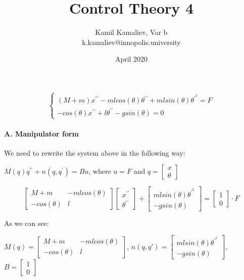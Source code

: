 \documentclass{article}
\title{Control Theory 4}
\author{Kamil Kamaliev, Var b \\ k.kamaliev@innopolis.university }
\date{April 2020}
\begin{document}
\maketitle

 $$
        \left\{ \begin{array}{ll} 
            (M+m)x^{\prime\prime}-mlcos(\theta)\theta^{\prime\prime}+mlsin(\theta)\theta^{\prime^2} = F\\
            -cos(\theta)x^{\prime\prime}+l\theta^{\prime\prime}-gsin(\theta) = 0
        \end{array} \right.
$$

 
    \paragraph{A. Manipulator form}
    
    \leavevmode
    
    \noindent
    We need to rewrite the system above in the following way: 
    
    $M(q)q^{\prime\prime}+n(q, q^\prime)=Bu$, where $u=F$ and $q=\begin{bmatrix} x\\ \theta \end{bmatrix}$
    
    $$
        \begin{bmatrix}
            M+m & -mlcos(\theta) \\
            -cos(\theta) & l
        \end{bmatrix}
        \begin{bmatrix}
            x^{\prime\prime} \\
            \theta^{\prime\prime}
        \end{bmatrix} +
        \begin{bmatrix}
            mlsin(\theta)\theta^{\prime^2} \\
            -gsin(\theta)
        \end{bmatrix} =
        \begin{bmatrix}
            1 \\ 0
        \end{bmatrix} \cdot F
    $$
    
    As we can see:
    
    \bigbreak
    
    $
    M(q) = 
        \begin{bmatrix}
            M+m & -mlcos(\theta) \\
            -cos(\theta) & l
        \end{bmatrix}
    $, 
    $
    n(q,q') = 
        \begin{bmatrix}
            mlsin(\theta)\theta^{\prime^2} \\
            -gsin(\theta)
        \end{bmatrix}
    $,
    $
    B = 
        \begin{bmatrix}
            1 \\
            0
        \end{bmatrix}
    $
    
\end{document}
